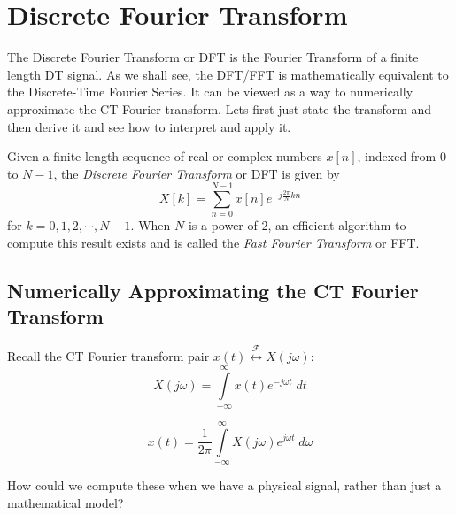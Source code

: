 \chapter{Discrete Fourier Transform}

The Discrete Fourier Transform or DFT is the Fourier Transform of a finite length DT signal. As we shall see, the DFT/FFT is mathematically equivalent to the Discrete-Time Fourier Series. It can be viewed as a way to numerically approximate the CT Fourier transform. Lets first just state the transform and then derive it and see how to interpret and apply it.

Given a finite-length sequence of real or complex numbers $x[n]$, indexed from $0$ to $N-1$, the \emph{Discrete Fourier Transform} or DFT is given by
\[
X[k] = \sum_{n = 0}^{N-1}  x[n] e^{-j \frac{2\pi}{N}k n}
\]
for $k = 0, 1, 2, \cdots, N-1$. When $N$ is a power of 2, an efficient algorithm to compute this result exists and is called the \emph{Fast Fourier Transform} or FFT.

\section{Numerically Approximating the CT Fourier Transform}

Recall the CT Fourier transform pair $x(t) \stackrel{\mathcal{F}}{\longleftrightarrow} X(j\omega)$:
\[
X(j\omega) = \int\limits_{-\infty}^{\infty} x(t) e^{-j\omega t} \; dt
\]

\[
x(t) = \frac{1}{2\pi} \int\limits_{-\infty}^{\infty} X(j\omega) e^{j\omega t} \; d\omega
\]

How could we compute these when we have a physical signal, rather than just a mathematical model?

